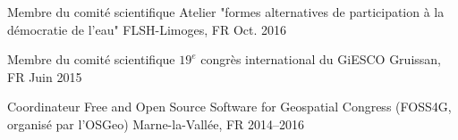 \begin{cvhonors}
  \cvhonor
    {Membre du comité scientifique} %
    {Atelier "formes alternatives de participation à la démocratie de l'eau"} %
    {FLSH-Limoges, FR} %
    {Oct. 2016} %

  \cvhonor
    {Membre du comité scientifique} %
    {$19^{e}$ congrès international du GiESCO} %
    {Gruissan, FR} %
    {Juin 2015} %

\cvhonor
  {Coordinateur} %
  {Free and Open Source Software for Geospatial Congress (FOSS4G, organisé par l'OSGeo)} %
  {Marne-la-Vallée, FR} %
  {2014--2016} %

\end{cvhonors}
